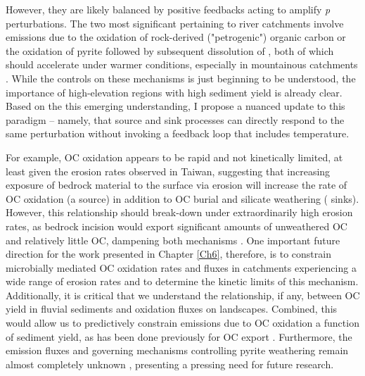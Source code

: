 However, they are likely balanced by positive feedbacks acting to amplify \textit{p} perturbations. The two most significant pertaining to river catchments involve  emissions due to the oxidation of rock-derived ("petrogenic") organic carbon \citep[OC;][Chapter \ref{Ch6}]{Hilton:2014dh} or the oxidation of pyrite followed by subsequent dissolution of  \citep{Torres:2014cx}, both of which should accelerate under warmer conditions, especially in mountainous catchments \citep{Torres:2016bd}. While the controls on these mechanisms is just beginning to be understood, the importance of high-elevation regions with high sediment yield is already clear. Based on the this emerging understanding, I propose a nuanced update to this paradigm -- namely, that  source and sink processes can directly respond to the same perturbation without invoking a feedback loop that includes temperature.

For example, OC oxidation appears to be rapid and not kinetically limited, at least given the erosion rates observed in Taiwan, suggesting that increasing exposure of bedrock material to the surface via erosion will increase the rate of OC oxidation (a  source) in addition to OC burial and silicate weathering ( sinks). However, this relationship should break-down under extraordinarily high erosion rates, as bedrock incision would export significant amounts of unweathered OC and relatively little OC, dampening both mechanisms \citep{Hilton:2011jw}. One important future direction for the work presented in Chapter \ref{Ch6}, therefore, is to constrain microbially mediated OC oxidation rates and fluxes in catchments experiencing a wide range of erosion rates and to determine the kinetic limits of this mechanism. Additionally, it is critical that we understand the relationship, if any, between OC yield in fluvial sediments and oxidation fluxes on landscapes. Combined, this would allow us to predictively constrain  emissions due to OC oxidation a function of sediment yield, as has been done previously for OC export \citep{Galy:2015fx}. Furthermore, the  emission fluxes and governing mechanisms controlling pyrite weathering remain almost completely unknown \citep{Calmels:2007fk,Torres:2014cx}, presenting a pressing need for future research. 

